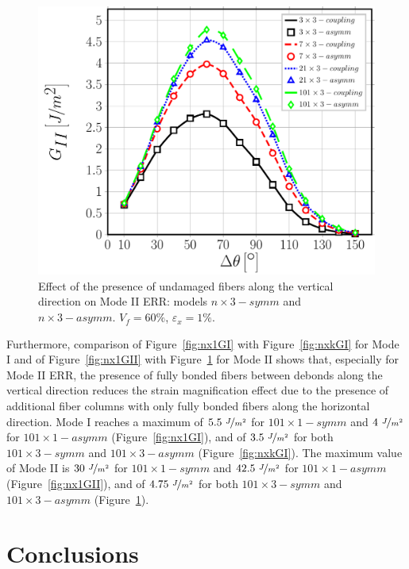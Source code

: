 \documentclass[smallextended]{svjour3}       %
\begin{document}
\begin{figure}[!h]
\centering
\includegraphics[width=\textwidth]{nxk-coupling-vf60-GII.pdf}
\caption{Effect of the presence of undamaged fibers along the vertical direction on Mode II ERR: models $n\times 3-symm$ and $n\times 3-asymm$. $V_{f}=60\%$, $\varepsilon_{x}=1\%$.}\label{fig:nxkGII}
\end{figure}

Furthermore, comparison of Figure~\ref{fig:nx1GI} with Figure~\ref{fig:nxkGI} for Mode I and of Figure~\ref{fig:nx1GII} with Figure~\ref{fig:nxkGII} for Mode II shows that, especially for Mode II ERR, the presence of fully bonded fibers between debonds along the vertical direction reduces the strain magnification effect due to the presence of additional fiber columns with only fully bonded fibers along the horizontal direction. Mode I reaches a maximum of $5.5\ \nicefrac{J}{m^{2}}$ for $101\times 1-symm$ and $4\  \nicefrac{J}{m^{2}}$ for $101\times 1-asymm$ (Figure~\ref{fig:nx1GI}), and of $3.5\  \nicefrac{J}{m^{2}}$ for both $101\times 3-symm$ and $101\times 3-asymm$ (Figure~\ref{fig:nxkGI}). The maximum value of Mode II is $30\  \nicefrac{J}{m^{2}}$ for $101\times 1-symm$ and $42.5\  \nicefrac{J}{m^{2}}$ for $101\times 1-asymm$ (Figure~\ref{fig:nx1GII}), and of $4.75\  \nicefrac{J}{m^{2}}$ for both $101\times 3-symm$ and $101\times 3-asymm$ (Figure~\ref{fig:nxkGII}).

\section{Conclusions}\label{sec:conclusions}
\end{document}
